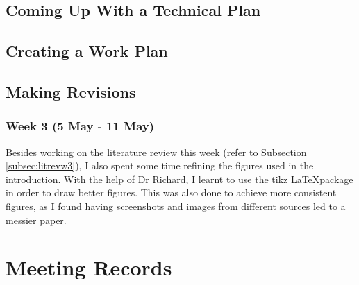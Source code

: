 \documentclass[a4paper, 12pt]{extreport}
\begin{document}
		\section{Coming Up With a Technical Plan}
		
		\section{Creating a Work Plan}
		
		\section{Making Revisions}
		
			\subsection{Week 3 (5 May - 11 May)}\label{subsec:revw3}
				
				Besides working on the literature review this week (refer to Subsection \ref{subsec:litrevw3}), I also spent some time refining the figures used in the introduction. With the help of Dr Richard, I learnt to use the tikz \LaTeX package in order to draw better figures. This was also done to achieve more consistent figures, as I found having screenshots and images from different sources led to a messier paper.
		
	\nocite{*}
	\printbibliography[heading={bibnumbered}, title={Bibliography}]
	
	\chapter{Meeting Records}
		
		
		
		
		
		
		
		
		
\end{document}
